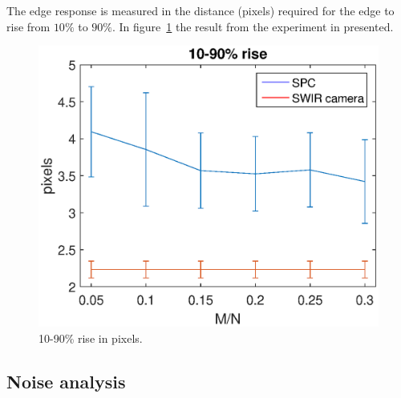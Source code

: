 

The edge response is measured in the distance (pixels) required for the edge to rise from $10\%$ to $90\%$. In figure~\ref{fig:rise} the result from the experiment in presented. 

\begin{figure}[H]
    \centering
    \includegraphics[width=0.7\linewidth]{result/mtf/Rise10_90.eps}
    \caption{10-90\% rise in pixels.}
    \label{fig:rise}
\end{figure}

\subsection{Noise analysis}
